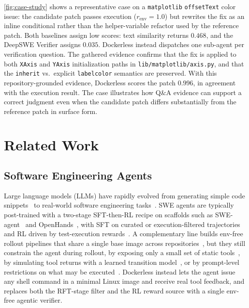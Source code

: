 \documentclass[]{arxiv_template}
\newcommand{\approach}{Dockerless\xspace}
\begin{document}
\cref{fig:case-study} shows a representative case on a \texttt{matplotlib} \texttt{offsetText} color issue: the candidate patch passes execution ($r_{\text{env}}{=}1.0$) but rewrites the fix as an inline conditional rather than the helper-variable refactor used by the reference patch.
Both baselines assign low scores: text similarity returns $0.468$, and the DeepSWE Verifier assigns $0.035$.
\approach instead dispatches one sub-agent per verification question. The gathered evidence confirms that the fix is applied to both \texttt{XAxis} and \texttt{YAxis} initialization paths in \texttt{lib/matplotlib/axis.py}, and that the \texttt{inherit} vs.\ explicit \texttt{labelcolor} semantics are preserved.
With this repository-grounded evidence, \approach scores the patch $0.996$, in agreement with the execution result. 
The case illustrates how Q\&A evidence can support a correct judgment even when the candidate patch differs substantially from the reference patch in surface form.



\section{Related Work}
\label{sec:related}

\subsection{Software Engineering Agents}
Large language models (LLMs) have rapidly evolved from generating simple code snippets~\cite{PengGGHL24,abs-2501-01329,GaoWGWZL23,shi2024code} to real-world software engineering tasks~\cite{jimenez2024swe,yang2024swe,li2025swe,chen2025swe}. SWE agents are typically post-trained with a two-stage SFT-then-RL recipe on scaffolds such as SWE-agent~\citep{yang2024swe} and OpenHands~\citep{wang2025openhands}, with SFT on curated or execution-filtered trajectories~\citep{pan2025training, jain2025r2e, yang2025swe, badertdinov2026swe, yang2025kimi} and RL driven by test-execution rewards~\citep{wei2025swerl, luo2025deepswe, golubev2025training, shao2024deepseekmath, yu2025dapo}.
A complementary line builds env-free rollout pipelines that share a single base image across repositories~\citep{sun2026swe,xu2025scalable,ludwig2026swe}, but they still constrain the agent during rollout, by exposing only a small set of static tools~\citep{xu2025scalable}, by simulating tool returns with a learned transition model~\citep{sun2026swe}, or by prompt-level restrictions on what may be executed~\citep{ludwig2026swe}.
\approach instead lets the agent issue any shell command in a minimal Linux image and receive real tool feedback, and replaces both the RFT-stage filter and the RL reward source with a single env-free agentic verifier.
\end{document}
